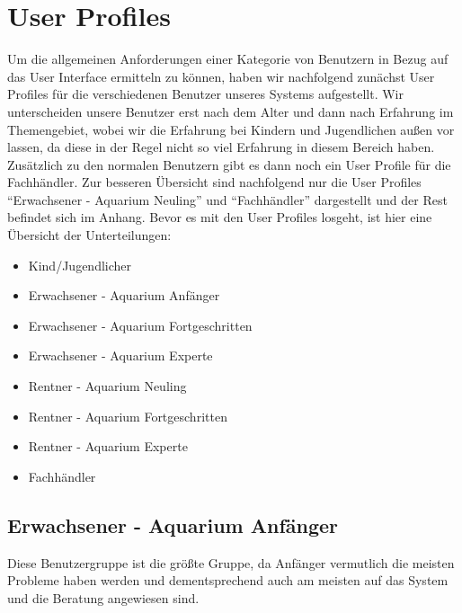 \chapter{User Profiles}\label{userprofiles}

Um die allgemeinen Anforderungen einer Kategorie von Benutzern in Bezug auf das User Interface ermitteln zu können, haben wir nachfolgend zunächst User Profiles für die verschiedenen Benutzer unseres Systems aufgestellt. Wir unterscheiden unsere Benutzer erst nach dem Alter und dann nach Erfahrung im Themengebiet, wobei wir die Erfahrung bei Kindern und Jugendlichen außen vor lassen, da diese in der Regel nicht so viel Erfahrung in diesem Bereich haben. Zusätzlich zu den normalen Benutzern gibt es dann noch ein User Profile für die Fachhändler. Zur besseren Übersicht sind nachfolgend nur die User Profiles ``Erwachsener - Aquarium Neuling'' und ``Fachhändler'' dargestellt und der Rest befindet sich im Anhang. Bevor es mit den User Profiles losgeht, ist hier eine Übersicht der Unterteilungen:

\begin{itemize}
\item Kind/Jugendlicher
\item Erwachsener - Aquarium Anfänger
\item Erwachsener - Aquarium Fortgeschritten
\item Erwachsener - Aquarium Experte
\item Rentner - Aquarium Neuling
\item Rentner - Aquarium Fortgeschritten
\item Rentner - Aquarium Experte
\item Fachhändler
\end{itemize}

\renewcommand{\title}{Erwachsener - Aquarium Anfänger}
\section{\title}

Diese Benutzergruppe ist die größte Gruppe, da Anfänger vermutlich die meisten Probleme haben werden und dementsprechend auch am meisten auf das System und die Beratung angewiesen sind. 

